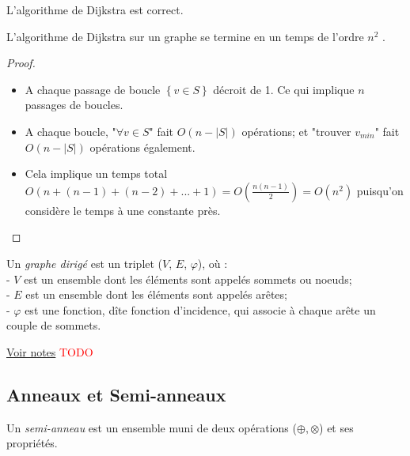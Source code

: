 \begin{mycorr} 
  L’algorithme de Dijkstra est correct.
\end{mycorr}

\begin{mytheo} 
  L’algorithme de Dijkstra sur un graphe se termine en un temps de l’ordre $n^2$ .
  \begin{proof}
    \begin{itemize}
		\item A chaque passage de boucle $\left\lbrace v \in S \right\rbrace $ décroit de 1. Ce qui implique $n$ passages de boucles.
		\item A chaque boucle, "$\forall v \in S$" fait $O(n-|S|)$ opérations; et "trouver $v_{min}$" fait $O(n-|S|)$ opérations également.
		\item Cela implique un temps total $O(n + (n-1) + (n-2) + ... + 1) = O\left( \frac{n(n-1)}{2} \right) = O(n^2)$ puisqu'on considère le temps à une constante près. 
		\end{itemize}
  \end{proof}
\end{mytheo}

\begin{mydef}
  Un \emph{graphe dirigé} est un triplet ($V$, $E$, $\varphi$), où :\\
  - $V$ est un ensemble dont les éléments sont appelés sommets ou noeuds; \\
  - $E$ est un ensemble dont les éléments sont appelés arêtes; \\
  - $\varphi$ est une fonction, dîte fonction d'incidence, qui associe à chaque arête un couple de sommets. \\
\end{mydef}

\begin{myexem}
  \href{https://dl.dropboxusercontent.com/u/44092863/Graph_Theory_Romain_Capron.pdf}{Voir notes} \textcolor{red}{TODO}
\end{myexem}

\subsection{Anneaux et Semi-anneaux}
\begin{mydef}
Un \emph{semi-anneau} est un ensemble muni de deux opérations ($\oplus,\otimes$) et ses propriétés.
\end{mydef}

